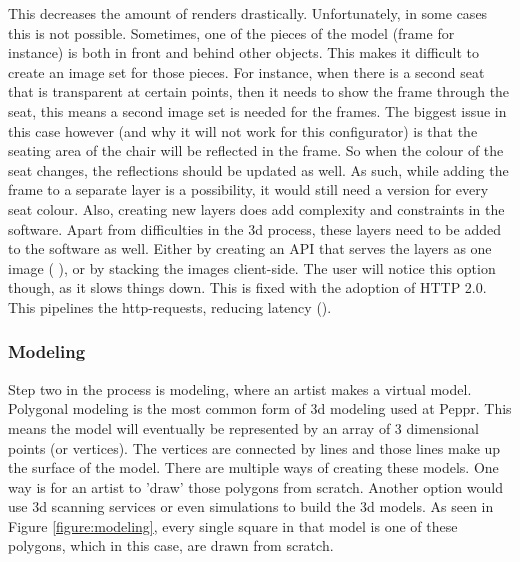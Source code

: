 This decreases the amount of renders drastically. Unfortunately, in some cases this is not possible. Sometimes, one of the pieces of the model (frame for instance) is both in front and behind other objects. This makes it difficult to create an image set for those pieces. For instance, when there is a second seat that is transparent at certain points, then it needs to show the frame through the seat, this means a second image set is needed for the frames. The biggest issue in this case however (and why it will not work for this configurator) is that the seating area of the chair will be reflected in the frame. So when the colour of the seat changes, the reflections should be updated as well. As such, while adding the frame to a separate layer is a possibility, it would still need a version for every seat colour. Also, creating new layers does add complexity and constraints in the software.
\newline
Apart from difficulties in the 3d process, these layers need to be added to the software as well. Either by creating an API that serves the layers as one image (\cite{bugaboo} ), or by stacking the images client-side. The user will notice this option though, as it slows things down. This is fixed with the adoption of HTTP 2.0. This pipelines the http-requests, reducing latency (\cite{latency}).

\clearpage
\subsubsection{Modeling}

Step two in the process is modeling, where an artist makes a virtual model. Polygonal modeling is the most common form of 3d modeling used at Peppr. This means the model will eventually be represented by an array of 3 dimensional points (or vertices). The vertices are connected by lines and those lines make up the surface of the model. There are multiple ways of creating these models. One way is for an artist to 'draw' those polygons from scratch. Another option would use 3d scanning services or even simulations to build the 3d models.
As seen in Figure \ref{figure:modeling}, every single square in that model is one of these polygons, which in this case, are drawn from scratch.

